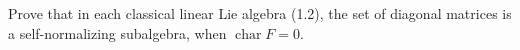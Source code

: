 Prove that in each classical linear Lie algebra (1.2), the set of diagonal matrices is a self-normalizing subalgebra, when $\operatorname{char} F = 0$.
